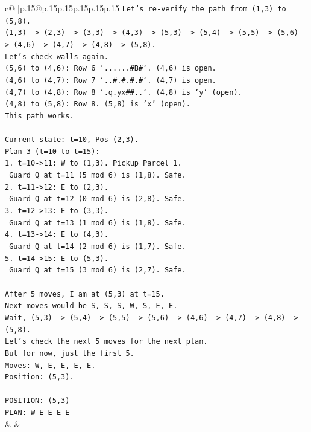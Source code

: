 \documentclass{article}
\begin{document}
{\begin{supertabular}{c@{$\;$}|p{.15\linewidth}@{}p{.15\linewidth}p{.15\linewidth}p{.15\linewidth}p{.15\linewidth}p{.15\linewidth}}
{{{\texttt{Let's re{-}verify the path from (1,3) to (5,8).} \\
\texttt{(1,3) {-}> (2,3) {-}> (3,3) {-}> (4,3) {-}> (5,3) {-}> (5,4) {-}> (5,5) {-}> (5,6) {-}> (4,6) {-}> (4,7) {-}> (4,8) {-}> (5,8).} \\
\texttt{Let's check walls again.} \\
\texttt{(5,6) to (4,6): Row 6 `......\#B\#`. (4,6) is open.} \\
\texttt{(4,6) to (4,7): Row 7 `..\#.\#.\#.\#`. (4,7) is open.} \\
\texttt{(4,7) to (4,8): Row 8 `.q.yx\#\#..`. (4,8) is 'y' (open).} \\
\texttt{(4,8) to (5,8): Row 8. (5,8) is 'x' (open).} \\
\texttt{This path works.} \\
\\ 
\texttt{Current state: t=10, Pos (2,3).} \\
\texttt{Plan 3 (t=10 to t=15):} \\
\texttt{1. t=10{-}>11: W to (1,3). Pickup Parcel 1.} \\
\texttt{   Guard Q at t=11 (5 mod 6) is (1,8). Safe.} \\
\texttt{2. t=11{-}>12: E to (2,3).} \\
\texttt{   Guard Q at t=12 (0 mod 6) is (2,8). Safe.} \\
\texttt{3. t=12{-}>13: E to (3,3).} \\
\texttt{   Guard Q at t=13 (1 mod 6) is (1,8). Safe.} \\
\texttt{4. t=13{-}>14: E to (4,3).} \\
\texttt{   Guard Q at t=14 (2 mod 6) is (1,7). Safe.} \\
\texttt{5. t=14{-}>15: E to (5,3).} \\
\texttt{   Guard Q at t=15 (3 mod 6) is (2,7). Safe.} \\
\\ 
\texttt{After 5 moves, I am at (5,3) at t=15.} \\
\texttt{Next moves would be S, S, S, W, S, E, E.} \\
\texttt{Wait, (5,3) {-}> (5,4) {-}> (5,5) {-}> (5,6) {-}> (4,6) {-}> (4,7) {-}> (4,8) {-}> (5,8).} \\
\texttt{Let's check the next 5 moves for the next plan.} \\
\texttt{But for now, just the first 5.} \\
\texttt{Moves: W, E, E, E, E.} \\
\texttt{Position: (5,3).} \\
\\ 
\texttt{POSITION: (5,3)} \\
\texttt{PLAN: W E E E E} \\
            }
        }
    }
    & & \\ \\


\end{supertabular}}
\end{document}

